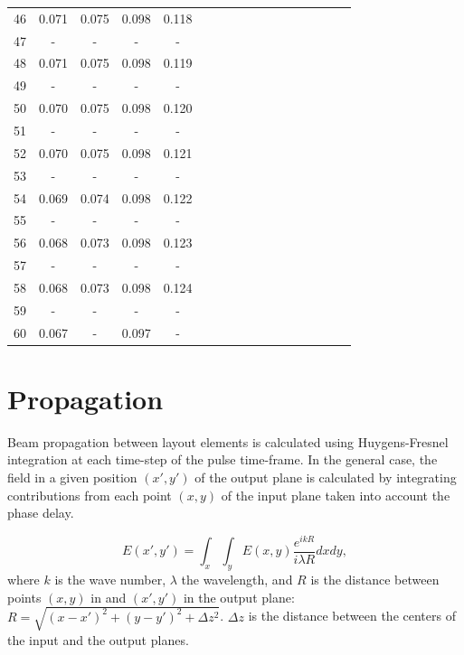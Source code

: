 \documentclass{report}
\begin{document}
\begin{table}
\begin{tabular}{|c|cccc|cccc|cccc|cccc|}
46 & 0.071 & 0.075 & 0.098 & 0.118 & & & & & & & & & & & &\\
47 &   -   &   -   &   -   &   -   & & & & & & & & & & & &\\
48 & 0.071 & 0.075 & 0.098 & 0.119 & & & & & & & & & & & &\\
49 &   -   &   -   &   -   &   -   & & & & & & & & & & & &\\
50 & 0.070 & 0.075 & 0.098 & 0.120 & & & & & & & & & & & &\\
51 &   -   &   -   &   -   &   -   & & & & & & & & & & & &\\
52 & 0.070 & 0.075 & 0.098 & 0.121 & & & & & & & & & & & &\\
53 &   -   &   -   &   -   &   -   & & & & & & & & & & & &\\
54 & 0.069 & 0.074 & 0.098 & 0.122 & & & & & & & & & & & &\\
55 &   -   &   -   &   -   &   -   & & & & & & & & & & & &\\
56 & 0.068 & 0.073 & 0.098 & 0.123 & & & & & & & & & & & &\\
57 &   -   &   -   &   -   &   -   & & & & & & & & & & & &\\
58 & 0.068 & 0.073 & 0.098 & 0.124 & & & & & & & & & & & &\\
59 &   -   &   -   &   -   &   -   & & & & & & & & & & & &\\
60 & 0.067 &   -   & 0.097 &   -   & & & & & & & & & & & &\\
\hline
\end{tabular}
\end{table}


\section{Propagation}
Beam propagation between layout elements is calculated using Huygens-Fresnel integration at each time-step of the pulse time-frame. In the general case, the field in a given position $(x',y')$ of the output plane is calculated by integrating contributions from each point $(x,y)$ of the input plane taken into account the phase delay.

\begin{equation*}
E(x', y') = \int_x\int_y E(x,y) \frac{e^{ikR}}{i\lambda R} dx dy,
\end{equation*}
where $k$ is the wave number, $\lambda$ the wavelength, and $R$ is the distance between points $(x,y)$ in and $(x',y')$ in the output plane: $R=\sqrt{(x-x')^2+(y-y')^2+\Delta z^2}$. $\Delta z$ is the distance between the centers of the input and the output planes.
\end{document}
